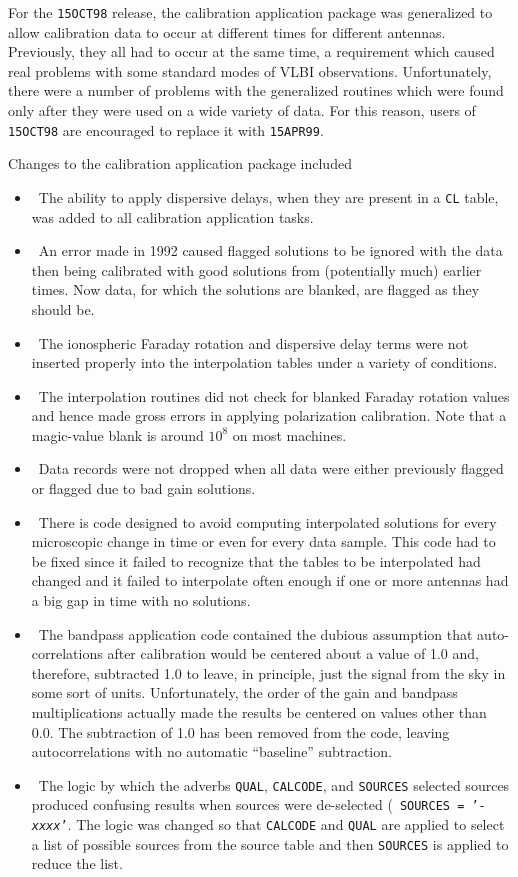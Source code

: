 For the {\tt 15OCT98} release, the calibration application package was
generalized to allow calibration data to occur at different times for
different antennas.  Previously, they all had to occur at the same
time, a requirement which caused real problems with some standard
modes of VLBI observations.  Unfortunately, there were a number of
problems with the generalized routines which were found only after
they were used on a wide variety of data.  For this reason, users of
{\tt 15OCT98} are encouraged to replace it with {\tt 15APR99}\@.

Changes to the calibration application package included
\begin{itemize}
\item\ The ability to apply dispersive delays, when they are present
   in a {\tt CL} table, was added to all calibration application
   tasks.
\item\ An error made in 1992 caused flagged solutions to be ignored
   with the data then being calibrated with good solutions from
   (potentially much) earlier times.  Now data, for which the
   solutions are blanked, are flagged as they should be.
\item\ The ionospheric Faraday rotation and dispersive delay terms
   were not inserted properly into the interpolation tables under a
   variety of conditions.
\item\ The interpolation routines did not check for blanked Faraday
   rotation values and hence made gross errors in applying
   polarization calibration.  Note that a magic-value blank is around
   $10^8$ on most machines.
\item\ Data records were not dropped when all data were either
   previously flagged or flagged due to bad gain solutions.
\item\ There is code designed to avoid computing interpolated
   solutions for every microscopic change in time or even for every
   data sample.  This code had to be fixed since it failed to
   recognize that the tables to be interpolated had changed and it
   failed to interpolate often enough if one or more antennas had a
   big gap in time with no solutions.
\item\ The bandpass application code contained the dubious assumption
   that auto-correlations after calibration would be centered about
   a value of 1.0 and, therefore, subtracted 1.0 to leave, in
   principle, just the signal from the sky in some sort of units.
   Unfortunately, the order of the gain and bandpass multiplications
   actually made the results be centered on values other than 0.0.
   The subtraction of 1.0 has been removed from the code, leaving
   autocorrelations with no automatic ``baseline'' subtraction.
\item\ The logic by which the adverbs {\tt QUAL}, {\tt CALCODE}, and
   {\tt SOURCES} selected sources produced confusing results when
   sources were de-selected (\ie\ {\tt SOURCES = '-{\it xxxx}'}.  The
   logic was changed so that {\tt CALCODE} and {\tt QUAL} are applied
   to select a list of possible sources from the source table and then
   {\tt SOURCES} is applied to reduce the list.
\end{itemize}


